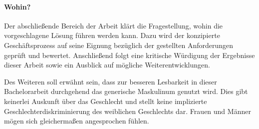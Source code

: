 \paragraph{Wohin?}
Der abschließende Bereich der Arbeit klärt die Fragestellung, wohin die vorgeschlagene Lösung führen werden kann. Dazu wird der konzipierte  Geschäftsprozess auf seine Eignung bezüglich der gestellten Anforderungen geprüft und bewertet. Anschließend folgt eine kritische Würdigung der Ergebnisse dieser Arbeit sowie ein Ausblick auf mögliche Weiterentwicklungen.

Des Weiteren soll erwähnt sein, dass zur besseren Lesbarkeit in dieser Bachelorarbeit durchgehend das generische Maskulinum genutzt wird. Dies gibt keinerlei Auskunft über das Geschlecht und stellt keine implizierte Geschlechterdiskriminierung des weiblichen Geschlechts dar. Frauen und Männer mögen sich gleichermaßen angesprochen fühlen.